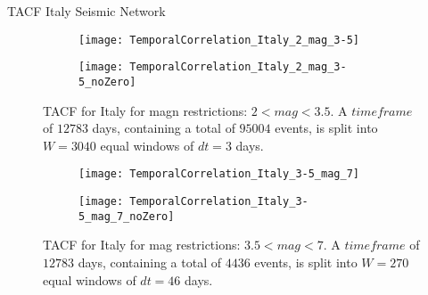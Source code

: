 \begin{frame}{TACF Italy Seismic Network}

\begin{figure}[!ht]
\begin{subfigure}{.5\textwidth}
  \centering
  \texttt{[image: TemporalCorrelation\_Italy\_2\_mag\_3-5]}
  \label{fig:corrItaly2_3.5}
\end{subfigure}%
\begin{subfigure}{.5\textwidth}
  \centering
  \texttt{[image: TemporalCorrelation\_Italy\_2\_mag\_3-5\_noZero]}
  \label{fig:corrItaly2_3.5_noZero}
\end{subfigure}
\caption{TACF for Italy for magn restrictions: $2<mag<3.5$. A $timeframe$ of $12783$ days, containing a total of $95004$ events, is split into $W=3040$ equal windows of $dt=3$ days.}
\label{fig:corrItaly2_3.5!}
\end{figure}

\begin{figure}[!ht]
\begin{subfigure}{.5\textwidth}
  \centering
  \texttt{[image: TemporalCorrelation\_Italy\_3-5\_mag\_7]}
  \label{fig:corrItaly3.5_7}
\end{subfigure}%
\begin{subfigure}{.5\textwidth}
  \centering
  \texttt{[image: TemporalCorrelation\_Italy\_3-5\_mag\_7\_noZero]}
  \label{fig:corrItaly3.5_7_noZero}
\end{subfigure}
\caption{TACF for Italy for mag restrictions: $3.5<mag<7$. A $timeframe$ of $12783$ days, containing a total of $4436$ events, is split into $W=270$ equal windows of $dt=46$ days.}
\label{fig:corrItaly3.5_7!}
\end{figure}
\end{frame}


